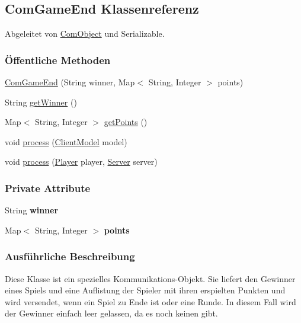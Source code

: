 \hypertarget{a00030}{\subsection{Com\-Game\-End Klassenreferenz}
\label{a00030}
}


Abgeleitet von \hyperlink{a00037}{Com\-Object} und Serializable.

\subsubsection*{Öffentliche Methoden}
\begin{DoxyCompactItemize}
\item 
\hyperlink{a00030_a226ed5c139cd4704d7713c774024b8fe}{Com\-Game\-End} (String winner, Map$<$ String, Integer $>$ points)
\item 
String \hyperlink{a00030_a159081d6eb49d67e8fe72bc03a47c336}{get\-Winner} ()
\item 
Map$<$ String, Integer $>$ \hyperlink{a00030_a6728b69386f5be617ae827369cc3cdd7}{get\-Points} ()
\item 
void \hyperlink{a00030_a758d7005755a181717f238f714d87dd2}{process} (\hyperlink{a00003}{Client\-Model} model)
\item 
void \hyperlink{a00030_ac67b5ce3ec03d48ef1e6caad6e49c902}{process} (\hyperlink{a00076}{Player} player, \hyperlink{a00077}{Server} server)
\end{DoxyCompactItemize}
\subsubsection*{Private Attribute}
\begin{DoxyCompactItemize}
\item 
\hypertarget{a00030_ab35aa0dc9c0abae0c68eac704e821d9c}{String {\bfseries winner}}\label{a00030_ab35aa0dc9c0abae0c68eac704e821d9c}

\item 
\hypertarget{a00030_a63905fe355f44800cedf835511d82d55}{Map$<$ String, Integer $>$ {\bfseries points}}\label{a00030_a63905fe355f44800cedf835511d82d55}

\end{DoxyCompactItemize}


\subsubsection{Ausführliche Beschreibung}
Diese Klasse ist ein spezielles Kommunikations-\/\-Objekt. Sie liefert den Gewinner eines Spiels und eine Auflistung der Spieler mit ihren erspielten Punkten und wird versendet, wenn ein Spiel zu Ende ist oder eine Runde. In diesem Fall wird der Gewinner einfach leer gelassen, da es noch keinen gibt. 

